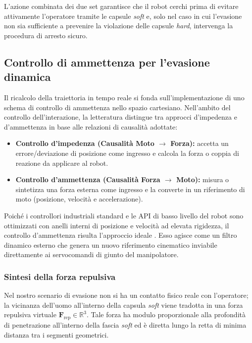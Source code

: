 L'azione combinata dei due set garantisce che il robot cerchi prima di evitare attivamente l'operatore tramite le capsule \textit{soft} e, solo nel caso in cui l'evasione non sia sufficiente a prevenire la violazione delle capsule \textit{hard}, intervenga la procedura di arresto sicuro.

\subsection{Controllo di ammettenza per l'evasione dinamica}
\label{subsec:ammettenza}

Il ricalcolo della traiettoria in tempo reale si fonda sull'implementazione di uno schema di controllo di ammettenza nello spazio cartesiano. Nell'ambito del controllo dell'interazione, la letteratura distingue tra approcci d'impedenza e d'ammettenza in base alle relazioni di causalità adottate:
\begin{itemize}
    \item \textbf{Controllo d'impedenza (Causalità Moto $\rightarrow$ Forza):} accetta un errore/deviazione di posizione come ingresso e calcola la forza o coppia di reazione da applicare al robot.
    \item \textbf{Controllo d'ammettenza (Causalità Forza $\rightarrow$ Moto):} misura o sintetizza una forza esterna come ingresso e la converte in un riferimento di moto (posizione, velocità e accelerazione).
\end{itemize}

Poiché i controllori industriali standard e le API di basso livello del robot sono ottimizzati con anelli interni di posizione e velocità ad elevata rigidezza, il controllo d'ammettenza risulta l'approccio ideale \cite{he2020admittance}. Esso agisce come un filtro dinamico esterno che genera un nuovo riferimento cinematico inviabile direttamente ai servocomandi di giunto del manipolatore.

\subsubsection{Sintesi della forza repulsiva}

Nel nostro scenario di evasione non si ha un contatto fisico reale con l'operatore; la vicinanza dell'uomo all'interno della capsula \textit{soft} viene tradotta in una forza repulsiva virtuale $\boldsymbol{F}_{\text{rep}} \in \mathbb{R}^3$. Tale forza ha modulo proporzionale alla profondità di penetrazione all'interno della fascia \textit{soft} ed è diretta lungo la retta di minima distanza tra i segmenti geometrici.

